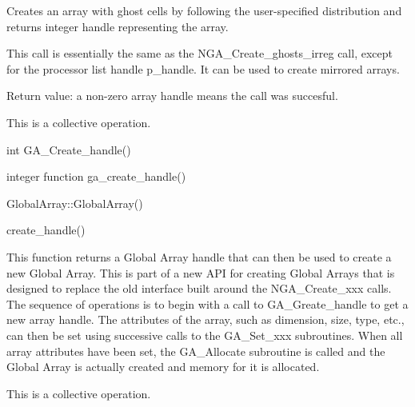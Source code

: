 \documentclass[12pt]{article}
\begin{document}
\begin{desc}

Creates an array with ghost cells by following the user-specified distribution
and returns integer handle representing the array.

This call is essentially the same as the NGA_Create_ghosts_irreg call, except
for the processor list handle p_handle. It can be used to create mirrored arrays.

Return value: a non-zero array handle means the call was succesful.

This is a collective operation.

\end{desc}



\begin{capi}
\begin{ccode}
int GA_Create_handle()
\end{ccode}
\end{capi}

\begin{fapi}
\begin{fcode}
integer function ga_create_handle()
\end{fcode}
\end{fapi}

\begin{cxxapi}
\begin{cxxcode}
GlobalArray::GlobalArray()
\end{cxxcode}
\end{cxxapi}

\begin{pyapi}
\begin{pycode}
create_handle()
\end{pycode}
\end{pyapi}

\begin{desc}

  This function returns a Global Array handle that can then be used to
  create a new Global Array. This is part of a new API for creating
  Global Arrays that is designed to replace the old interface built
  around the NGA_Create_xxx calls. The sequence of operations is to
  begin with a call to GA_Greate_handle to get a new array handle. The
  attributes of the array, such as dimension, size, type, etc., can
  then be set using successive calls to the GA_Set_xxx subroutines.
  When all array attributes have been set, the GA_Allocate subroutine
  is called and the Global Array is actually created and memory for it
  is allocated.

  This is a collective operation.

\end{desc}
\end{document}
